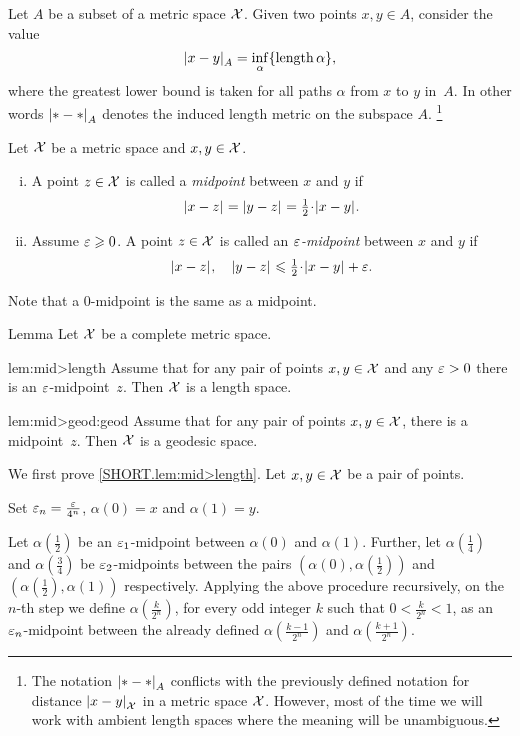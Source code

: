 Let $A$ be a subset of a metric space $\mathcal{X}$.
Given two points $x,y\in A$,
consider the value
\[\dist{x}{y}{A}=\inf_{\alpha}\{\length\alpha\},\]
where the greatest lower bound is taken for all paths $\alpha$ from $x$ to $y$ in~$A$.
In other words $\dist{*}{*}{A}$ denotes the induced length metric on the subspace $A$.%
\footnote{The notation $\dist{*}{*}{A}$ conflicts with the previously defined notation for distance $\dist{x}{y}{\spc{X}}$ in a metric space $\mathcal{X}$. However, most of the time we will work with ambient length spaces where the meaning will be unambiguous.}

Let $\mathcal{X}$ be a metric space and $x,y\in\mathcal{X}$.

\begin{enumerate}[(i)]
\item A point $z\in \mathcal{X}$ is called a \emph{midpoint} between $x$ and $y$
if 
\[\dist{x}{z}{}=\dist{y}{z}{}=\tfrac12\cdot\dist[{{}}]{x}{y}{}.\]
\item Assume $\varepsilon\geqslant 0$.
A point $z\in \mathcal{X}$ is called an \emph{$\varepsilon$-midpoint} between $x$ and $y$
if 
\[\dist{x}{z}{},\quad\dist{y}{z}{}\le\tfrac12\cdot\dist[{{}}]{x}{y}{}+\eps.\]
\end{enumerate}


Note that a $0$-midpoint is the same as a midpoint.


\begin{thm}{Lemma}\label{lem:mid>geod}
Let $\mathcal{X}$ be a complete metric space.
\begin{subthm}{lem:mid>length}
Assume that for any pair of points $x,y\in \mathcal{X}$  
 and any $\varepsilon>0$
there is an $\varepsilon$-midpoint~$z$.
Then $\mathcal{X}$ is a length space.
\end{subthm}

\begin{subthm}{lem:mid>geod:geod}
Assume that for any pair of points $x,y\in \mathcal{X}$, 
there is a midpoint~$z$.
Then $\mathcal{X}$ is a geodesic space.
\end{subthm}
\end{thm}

We first prove \ref{SHORT.lem:mid>length}.
Let $x,y\in \mathcal{X}$ be a pair of points.

Set $\varepsilon_n=\frac{\varepsilon}{4^n}$, $\alpha(0)=x$ and $\alpha(1)=y$.

Let $\alpha(\tfrac12)$ be an $\varepsilon_1$-midpoint between $\alpha(0)$ and $\alpha(1)$.
Further, let $\alpha(\frac14)$ 
and $\alpha(\frac34)$ be $\varepsilon_2$-midpoints between the pairs $(\alpha(0),\alpha(\tfrac12))$ 
and $(\alpha(\tfrac12),\alpha(1))$ respectively.
Applying the above procedure recursively,
on the $n$-th step we define $\alpha(\tfrac{k}{2^n})$,
for every odd integer $k$ such that $0<\tfrac k{2^n}<1$, 
as an $\varepsilon_{n}$-midpoint between the already defined
$\alpha(\tfrac{k-1}{2^n})$ and $\alpha(\tfrac{k+1}{2^n})$.


